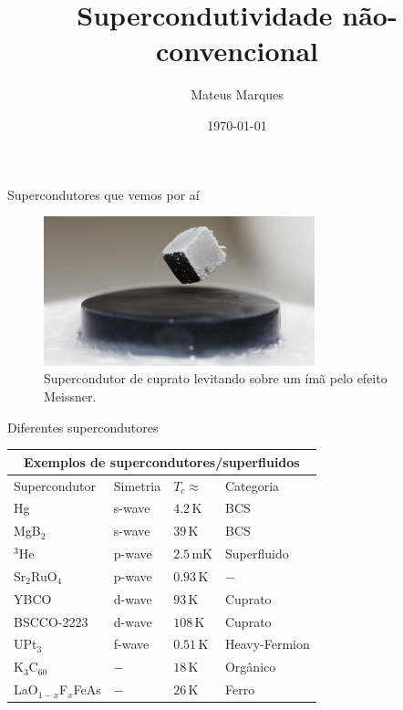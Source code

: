 \documentclass[8pt,aspectratio=169,xcolor={table,dvipsnames,usenames}]{beamer}
\title[Supercondutividade não-convencional]{\LARGE{Supercondutividade não-convencional}}
\author[Mateus Marques]{
\large{Mateus Marques
}}
\date{\today}
\begin{document}
\begin{frame}
  \titlepage
\end{frame}

\begin{frame}{Supercondutores que vemos por aí}

\begin{figure}[H]
\centering
\includegraphics[width=0.7\textwidth]{fig/levitating.jpg}
\caption{Supercondutor de cuprato levitando sobre um ímã pelo efeito Meissner.}
\label{fig:levitating}
\end{figure}

\end{frame}


\begin{frame}{Diferentes supercondutores}

\begin{center}
\begin{tabular}{ |p{3cm}||p{3cm}|p{3cm}|p{3cm}|  }
\hline
\multicolumn{4}{|c|}{Exemplos de supercondutores/superfluidos} \\
\hline
Supercondutor & Simetria & $T_c \approx$ & Categoria \\
\hline
Hg                   & s-wave   & $4.2   \, \text{K}$      & BCS \\
MgB$_2$              & s-wave   & $39    \, \text{K}$      & BCS \\
$^3$He               & p-wave   & $2.5   \, \text{mK}$     & Superfluido \\
Sr$_2$RuO$_4$        & p-wave   & $0.93  \, \text{K}$      & $-$ \\
YBCO                 & d-wave   & $93  \, \text{K}$        & Cuprato \\
BSCCO-2223           & d-wave   & $108   \, \text{K}$      & Cuprato \\
UPt$_3$              & f-wave   & $0.51  \, \text{K}$      & Heavy-Fermion \\
K$_3$C$_{60}$        & $-$      & $18    \, \text{K}$      & Orgânico  \\
LaO$_{1-x}$F$_x$FeAs & $-$      & $26    \, \text{K}$      & Ferro  \\
\hline
\end{tabular}
\end{center}

\end{frame}
\end{document}
